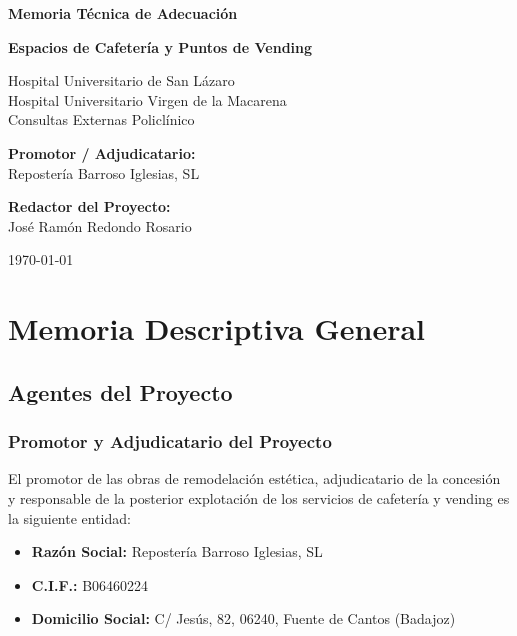 \documentclass[12pt,a4paper]{article}
\newcommand{\todo}[1]{#1}
\begin{document}
\begin{titlepage}
    \centering
    \vspace*{2cm}
    {\Huge\bfseries Memoria Técnica de Adecuación \par}
    \vspace{1.5cm}
    {\Large\bfseries Espacios de Cafetería y Puntos de Vending\par}
    \vspace{2cm}
    {\large Hospital Universitario de San Lázaro \\ Hospital Universitario Virgen de la Macarena \\ Consultas Externas Policlínico\par}
    \vspace{4cm}
    \vfill
    {\large\bfseries Promotor / Adjudicatario:} \\
    Repostería Barroso Iglesias, SL\par
    \vspace{0.8cm}
    {\large\bfseries Redactor del Proyecto:} \\
    \todo{José Ramón Redondo Rosario}\par
    \vfill
    {\large \today}
\end{titlepage}

\tableofcontents
\newpage

\section{Memoria Descriptiva General}

\subsection{Agentes del Proyecto}

\subsubsection{Promotor y Adjudicatario del Proyecto}
El promotor de las obras de remodelación estética, adjudicatario de la concesión y responsable de la posterior explotación de los servicios de cafetería y vending es la siguiente entidad:
\begin{itemize}
    \item \textbf{Razón Social:} Repostería Barroso Iglesias, SL
    \item \textbf{C.I.F.:} B06460224
    \item \textbf{Domicilio Social:} C/ Jesús, 82, 06240, Fuente de Cantos (Badajoz)
\end{itemize}
\end{document}
